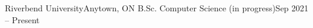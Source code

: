 
\resumeSubheading
  {Riverbend University}{Anytown, ON}
  {B.Sc. Computer Science (in progress)}{Sep 2021 -- Present}
  \resumeItemListStart
  \resumeItemListEnd
